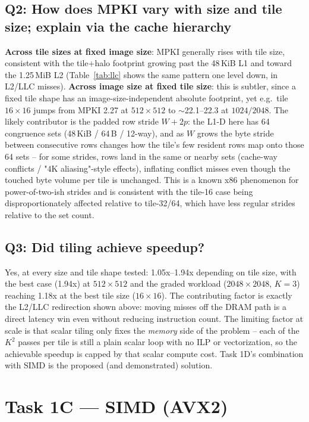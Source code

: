\documentclass[11pt]{article}
\begin{document}
\subsection*{Q2: How does MPKI vary with size and tile size; explain via the cache hierarchy}
\textbf{Across tile sizes at fixed image size}: MPKI generally rises with tile size,
consistent with the tile+halo footprint growing past the 48\,KiB L1 and toward the
1.25\,MiB L2 (Table~\ref{tab:llc} shows the same pattern one level down, in L2/LLC
misses). \textbf{Across image size at fixed tile size}: this is subtler, since a fixed
tile shape has an image-size-independent absolute footprint, yet e.g.\ tile
$16{\times}16$ jumps from MPKI 2.27 at $512{\times}512$ to $\sim$22.1--22.3 at
$1024/2048$. The likely contributor is the padded row stride $W{+}2p$: the L1-D here has
64 congruence sets (48\,KiB / 64\,B / 12-way), and as $W$ grows the byte stride between
consecutive rows changes how the tile's few resident rows map onto those 64 sets --
for some strides, rows land in the same or nearby sets (cache-way conflicts / "$4$K
aliasing"-style effects), inflating conflict misses even though the touched byte volume
per tile is unchanged. This is a known x86 phenomenon for power-of-two-ish strides and
is consistent with the tile-16 case being disproportionately affected relative to
tile-32/64, which have less regular strides relative to the set count.

\subsection*{Q3: Did tiling achieve speedup?}
Yes, at every size and tile shape tested: 1.05x--1.94x depending on tile size, with the
best case (1.94x) at $512{\times}512$ and the graded workload ($2048{\times}2048$,
$K{=}3$) reaching 1.18x at the best tile size ($16{\times}16$). The contributing factor
is exactly the L2/LLC redirection shown above: moving misses off the DRAM path is a
direct latency win even without reducing instruction count. The limiting factor at
scale is that scalar tiling only fixes the \emph{memory} side of the problem -- each of
the $K^2$ passes per tile is still a plain scalar loop with no ILP or vectorization, so
the achievable speedup is capped by that scalar compute cost. Task 1D's combination with
SIMD is the proposed (and demonstrated) solution.

\section{Task 1C --- SIMD (AVX2)}
\end{document}
